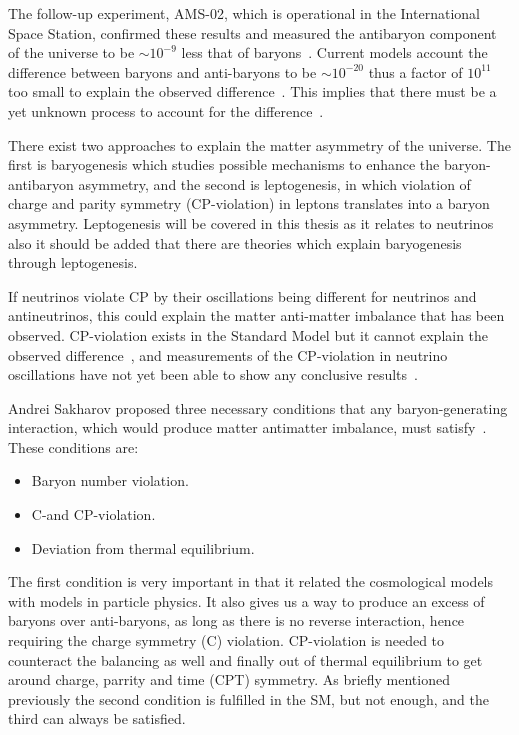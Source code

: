 The follow-up experiment, AMS-02, which is operational in the International Space Station, confirmed these results and measured the antibaryon component of the universe to be $\sim 10^{-9}$ less that of baryons~\cite{16AMS2}. Current models account the difference between baryons and anti-baryons to be $\sim 10^{-20}$  thus a factor of $10^{11}$ too small to explain the observed difference~\cite{49Matter}. This implies that there must be a yet unknown process to account for the difference~\cite{105Fukugita}.

There exist two approaches to explain the matter asymmetry of the universe. The first is baryogenesis which studies possible mechanisms to enhance the baryon-antibaryon asymmetry, and the second is leptogenesis, in which violation of charge and parity symmetry (CP-violation) in leptons translates into a baryon asymmetry. Leptogenesis will be covered in this thesis as it relates to neutrinos also it should be added that there are theories which explain baryogenesis through leptogenesis.

If neutrinos violate CP by their oscillations being different for neutrinos and antineutrinos, this could explain the matter anti-matter imbalance that has been observed. CP-violation exists in the Standard Model but it cannot explain the observed difference~\cite{3Peskin}, and measurements of the CP-violation in neutrino oscillations have not yet been able to show any conclusive results~\cite{17Gonzalez}.

Andrei Sakharov proposed three necessary conditions that any baryon-generating interaction, which would produce matter antimatter imbalance, must satisfy~\cite{37Sakharov}. These conditions are:
\begin{itemize}
\item Baryon number violation.
\item C-and CP-violation. %
\item Deviation from thermal equilibrium.
\end{itemize}

The first condition is very important in that it related the cosmological models with models in particle physics. It also gives us a way to produce an excess of baryons over anti-baryons, as long as there is no reverse interaction, hence requiring the charge symmetry (C) violation. CP-violation is needed to counteract the balancing as well and finally out of thermal equilibrium to get around charge, parrity and time (CPT) symmetry. As briefly mentioned previously the second condition is fulfilled in the SM, but not enough, and the third can always be satisfied.

